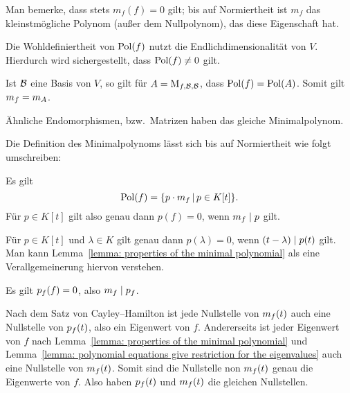 \begin{remark}
  Man bemerke, dass stets $m_f(f) = 0$ gilt;
  bis auf Normiertheit ist $m_f$ das kleinstmögliche Polynom (außer dem Nullpolynom), das diese Eigenschaft hat.
\end{remark}

\begin{remark}
  Die Wohldefiniertheit von $\operatorname{Pol}(f)$ nutzt die Endlichdimensionalität von $V$.
  Hierdurch wird sichergestellt, dass $\operatorname{Pol}(f) \neq 0$ gilt.
\end{remark}

\begin{lemma}
  Ist $\mathcal{B}$ eine Basis von $V$, so gilt für $A = \operatorname{M}_{f, \mathcal{B}, \mathcal{B}}$, dass $\operatorname{Pol}(f) = \operatorname{Pol}(A)$.
  Somit gilt $m_{f} = m_{A}$.
\end{lemma}

\begin{corollary}
  Ähnliche Endomorphismen, bzw.\ Matrizen haben das gleiche Minimalpolynom.
\end{corollary}

Die Definition des Minimalpolynoms lässt sich bis auf Normiertheit wie folgt umschreiben:

\begin{lemma}
  \label{lemma: properties of the minimal polynomial}
  Es gilt
  \[
      \operatorname{Pol}(f)
    = \{ p \cdot m_{f} \,|\, p \in K[t] \}.
  \]
  Für $p \in K[t]$ gilt also genau dann $p(f) = 0$, wenn $m_{f} \mid p$ gilt.
\end{lemma}

\begin{remark}
  Für $p \in K[t]$ und $\lambda \in K$ gilt genau dann $p(\lambda) = 0$, wenn $(t - \lambda) \mid p(t)$ gilt.
  Man kann Lemma~\ref{lemma: properties of the minimal polynomial} als eine Verallgemeinerung hiervon verstehen.
\end{remark}

\begin{theorem}
  Es gilt $p_{f}(f) = 0$, also $m_{f} \mid p_{f}$.
\end{theorem}

Nach dem Satz von Cayley--Hamilton ist jede Nullstelle von $m_{f}(t)$ auch eine Nullstelle von $p_{f}(t)$, also ein Eigenwert von $f$.
Andererseits ist jeder Eigenwert von $f$ nach Lemma~\ref{lemma: properties of the minimal polynomial} und Lemma~\ref{lemma: polynomial equations give restriction for the eigenvalues} auch eine Nullstelle von $m_{f}(t)$.
Somit sind die Nullstelle non $m_{f}(t)$ genau die Eigenwerte von $f$.
Also haben $p_{f}(t)$ und $m_{f}(t)$ die gleichen Nullstellen.

